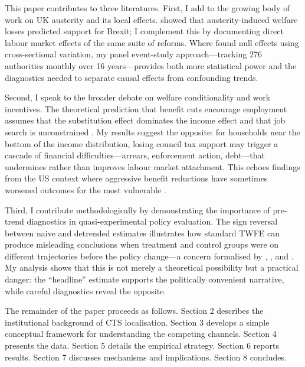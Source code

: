 \documentclass[12pt]{article}
\begin{document}
This paper contributes to three literatures. First, I add to the growing body of work on UK austerity and its local effects. \citet{fetzer2019austerity} showed that austerity-induced welfare losses predicted support for Brexit; I complement this by documenting direct labour market effects of the same suite of reforms. Where \citet{adam2019taxing} found null effects using cross-sectional variation, my panel event-study approach---tracking 276 authorities monthly over 16 years---provides both more statistical power and the diagnostics needed to separate causal effects from confounding trends.

Second, I speak to the broader debate on welfare conditionality and work incentives. The theoretical prediction that benefit cuts encourage employment assumes that the substitution effect dominates the income effect and that job search is unconstrained \citep{blundell2000employment, brewer2010labour}. My results suggest the opposite: for households near the bottom of the income distribution, losing council tax support may trigger a cascade of financial difficulties---arrears, enforcement action, debt---that undermines rather than improves labour market attachment. This echoes findings from the US context where aggressive benefit reductions have sometimes worsened outcomes for the most vulnerable \citep{blank2002evaluating, hoynes2016antipoverty}.

Third, I contribute methodologically by demonstrating the importance of pre-trend diagnostics in quasi-experimental policy evaluation. The sign reversal between naive and detrended estimates illustrates how standard TWFE can produce misleading conclusions when treatment and control groups were on different trajectories before the policy change---a concern formalised by \citet{goodmanbacon2021difference}, \citet{roth2023pretest}, and \citet{borusyak2024revisiting}. My analysis shows that this is not merely a theoretical possibility but a practical danger: the ``headline'' estimate supports the politically convenient narrative, while careful diagnostics reveal the opposite.

The remainder of the paper proceeds as follows. Section 2 describes the institutional background of CTS localisation. Section 3 develops a simple conceptual framework for understanding the competing channels. Section 4 presents the data. Section 5 details the empirical strategy. Section 6 reports results. Section 7 discusses mechanisms and implications. Section 8 concludes.
\end{document}
